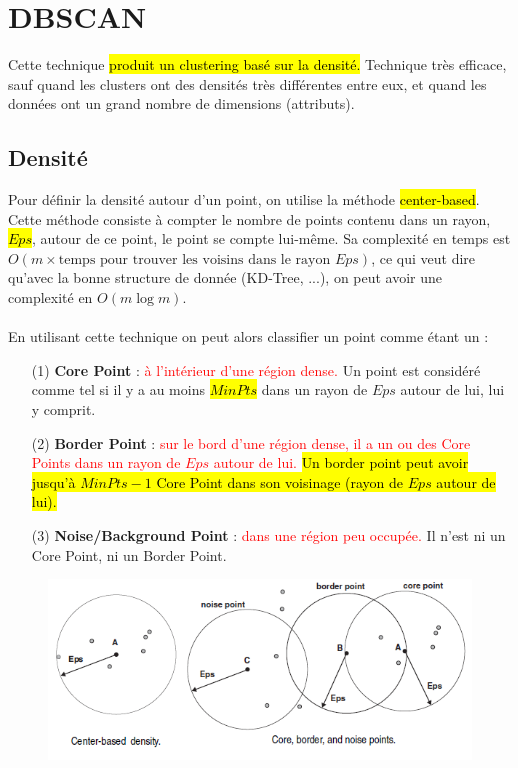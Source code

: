 \documentclass[letterpaper, 12pt]{article}
\newcommand{\alinea}{
\hspace*{0.5cm}}
\newcommand{\red}[1]{
	\textcolor{red}{#1}}
\begin{document}
	\section{DBSCAN}
		\alinea Cette technique \hl{produit un clustering basé sur la densité.} 
			Technique très efficace, sauf quand les clusters ont des densités
			très différentes entre eux, et quand les données ont 
			un grand nombre de dimensions (attributs).
		\subsection{Densité}
			\alinea Pour définir la densité autour d'un point, on utilise 
				la méthode \hl{center-based}. Cette méthode consiste à compter
				le nombre de points contenu dans un rayon, \hl{$Eps$}, autour
				de ce point, le point se compte lui-même. Sa complexité 
				en temps est \\
				$O(m \times \text{temps pour trouver les
				voisins dans le rayon } Eps)$, ce qui veut dire qu'avec
				la bonne structure de donnée (KD-Tree, ...), on peut
				avoir une complexité en $O(m \log m)$.\\
			~\\
			\alinea En utilisant cette technique on peut alors classifier 
				un point comme étant un : 
				\begin{itemize}
					\setlength{\itemsep}{0pt}
					\setlength{\parskip}{0pt}
					\setlength{\parsep}{0pt}
					\item[(1)] \textbf{Core Point} : \red{à l'intérieur d'une
						région dense.} Un point est considéré comme tel
						si il y a au moins \hl{$MinPts$} dans un rayon 
						de $Eps$ autour de lui, lui y comprit.
					\item[(2)] \textbf{Border Point} : \red{sur le bord d'une
						région dense, il a un ou des Core Points dans un
						rayon de $Eps$ autour de lui.} 
						\hl{Un border point peut avoir jusqu'à $MinPts -1$
						Core Point dans son voisinage (rayon de $Eps$ autour de lui).}
					\item[(3)] \textbf{Noise/Background Point} : \red{dans une
						région peu occupée.} Il n'est ni un Core Point, ni
						un Border Point.
				\end{itemize}
			\begin{figure}[H]
				\centering
				\includegraphics[scale=0.8]{Images/dbscan_eps.png}
				\caption{}
				\label{fig:dbscan:eps}
			\end{figure}\noindent
		\newpage
\end{document}

